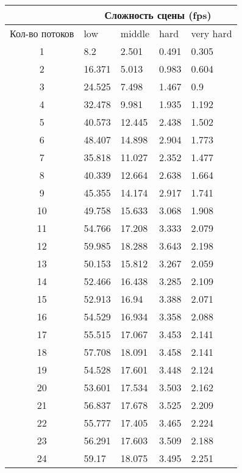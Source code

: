 \begin{center}
\begin{longtable}{|c|p{2cm}|p{2cm}|p{2cm}|p{2cm}|}
\hline & \multicolumn{4}{c|}{Сложность сцены (fps)} \\ 
\hline Кол-во потоков & low & middle & hard &  very hard\\ 
\hline 1 &  8.2 & 2.501 & 0.491 & 0.305 \\ 
\hline 2 &  16.371 & 5.013 & 0.983 & 0.604 \\ 
\hline 3 &  24.525 & 7.498 & 1.467 & 0.9 \\ 
\hline 4 &  32.478 & 9.981 & 1.935 & 1.192 \\ 
\hline 5 &  40.573 & 12.445 & 2.438 & 1.502 \\ 
\hline 6 &  48.407 & 14.898 & 2.904 & 1.773 \\ 
\hline 7 &  35.818 & 11.027 & 2.352 & 1.477 \\ 
\hline 8 &  40.339 & 12.664 & 2.638 & 1.664 \\ 
\hline 9 &  45.355 & 14.174 & 2.917 & 1.741 \\ 
\hline 10 &  49.758 & 15.633 & 3.068 & 1.908 \\ 
\hline 11 &  54.766 & 17.208 & 3.333 & 2.079 \\ 
\hline 12 &  59.985 & 18.288 & 3.643 & 2.198 \\ 
\hline 13 &  50.153 & 15.812 & 3.267 & 2.059 \\ 
\hline 14 &  52.466 & 16.438 & 3.285 & 2.109 \\ 
\hline 15 &  52.913 & 16.94 & 3.388 & 2.071 \\ 
\hline 16 &  54.529 & 16.934 & 3.358 & 2.088 \\ 
\hline 17 &  55.515 & 17.067 & 3.453 & 2.141 \\ 
\hline 18 &  57.708 & 18.091 & 3.458 & 2.141 \\ 
\hline 19 &  54.528 & 17.601 & 3.448 & 2.124 \\ 
\hline 20 &  53.601 & 17.534 & 3.503 & 2.162 \\ 
\hline 21 &  56.837 & 17.678 & 3.525 & 2.209 \\ 
\hline 22 &  55.777 & 17.405 & 3.465 & 2.224 \\ 
\hline 23 &  56.291 & 17.603 & 3.509 & 2.188 \\ 
\hline 24 &  59.17 & 18.075 & 3.495 & 2.251 \\ 
\hline
\end{longtable}
\end{center}

